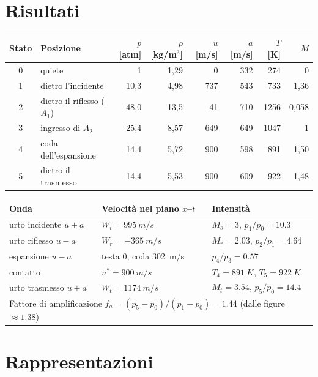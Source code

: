 \documentclass[11pt,a4paper]{article}
\newcommand{\uma}{u-a}
\newcommand{\upa}{u+a}
\newcommand{\Mr}{M_{r}}
\newcommand{\fa}{f_a}
\begin{document}
\section{Risultati}
\begin{table}[H]
  \centering
  \begin{tabular}{clrrrrrr}
    \toprule
    Stato & Posizione & $p$ [atm] & $\rho$ [kg/m$^3$] & $u$ [m/s] & $a$ [m/s] & $T$ [K] & $M$ \\
    \midrule
    0 & quiete & 1 & 1,29 & 0 & 332 & 274 & 0 \\
    1 & dietro l'incidente & 10,3 & 4,98 & 737 & 543 & 733 & 1,36 \\
    2 & dietro il riflesso ($A_1$) & 48,0 & 13,5 & 41 & 710 & 1256 & 0,058 \\
    3 & ingresso di $A_2$ & 25,4 & 8,57 & 649 & 649 & 1047 & 1 \\
    4 & coda dell'espansione & 14,4 & 5,72 & 900 & 598 & 891 & 1,50 \\
    5 & dietro il trasmesso & 14,4 & 5,53 & 900 & 609 & 922 & 1,48 \\
    \bottomrule
  \end{tabular}
\end{table}
\begin{table}[H]
  \centering
  \begin{tabular}{lll}
    \toprule
    Onda & Velocità nel piano $x$--$t$ & Intensità \\
    \midrule
    urto incidente $\upa$ & $W_i=\SI{995}{m/s}$ & $M_s=3$, $p_1/p_0=\num{10.3}$ \\
    urto riflesso $\uma$ & $W_r=\SI{-365}{m/s}$ & $\Mr=\num{2.03}$, $p_2/p_1=\num{4.64}$ \\
    espansione $\uma$ & testa 0, coda \SI{302}{m/s} & $p_4/p_3=\num{0.57}$ \\
    contatto & $u^*=\SI{900}{m/s}$ & $T_4=\SI{891}{K}$, $T_5=\SI{922}{K}$ \\
    urto trasmesso $\upa$ & $W_t=\SI{1174}{m/s}$ & $M_t=\num{3.54}$, $p_5/p_0=\num{14.4}$ \\
    \midrule
    \multicolumn{3}{l}{Fattore di amplificazione $\fa=(p_5-p_0)/(p_1-p_0)=\num{1.44}$ (dalle figure $\approx\num{1.38}$)} \\
    \bottomrule
  \end{tabular}
\end{table}

\section{Rappresentazioni}\label{sec:rappr}
\end{document}

